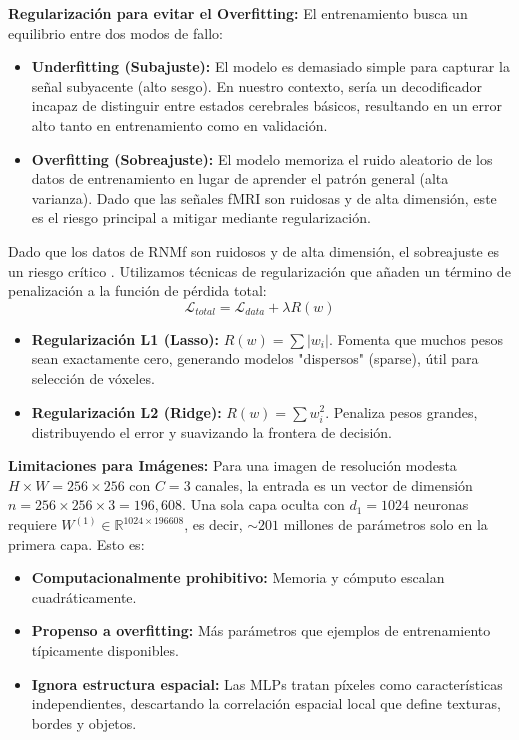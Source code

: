 \documentclass{article}
\begin{document}
\textbf{Regularización para evitar el Overfitting:}
El entrenamiento busca un equilibrio entre dos modos de fallo:
\begin{itemize}
    \item \textbf{Underfitting (Subajuste):} El modelo es demasiado simple para capturar la señal subyacente (alto sesgo). En nuestro contexto, sería un decodificador incapaz de distinguir entre estados cerebrales básicos, resultando en un error alto tanto en entrenamiento como en validación.
    \item \textbf{Overfitting (Sobreajuste):} El modelo memoriza el ruido aleatorio de los datos de entrenamiento en lugar de aprender el patrón general (alta varianza). Dado que las señales fMRI son ruidosas y de alta dimensión, este es el riesgo principal a mitigar mediante regularización.
\end{itemize}
Dado que los datos de RNMf son ruidosos y de alta dimensión, el sobreajuste es un riesgo crítico \cite{14}. Utilizamos técnicas de regularización que añaden un término de penalización a la función de pérdida total:
\begin{equation}
    \mathcal{L}_{total} = \mathcal{L}_{data} + \lambda R(w)
\end{equation}
\begin{itemize}
    \item \textbf{Regularización L1 (Lasso):} $R(w) = \sum |w_i|$. Fomenta que muchos pesos sean exactamente cero, generando modelos "dispersos" (sparse), útil para selección de vóxeles.
    \item \textbf{Regularización L2 (Ridge):} $R(w) = \sum w_i^2$. Penaliza pesos grandes, distribuyendo el error y suavizando la frontera de decisión.
\end{itemize}

\textbf{Limitaciones para Imágenes:} Para una imagen de resolución modesta $H \times W = 256 \times 256$ con $C=3$ canales, la entrada es un vector de dimensión $n = 256 \times 256 \times 3 = 196{,}608$. Una sola capa oculta con $d_1 = 1024$ neuronas requiere $W^{(1)} \in \mathbb{R}^{1024 \times 196608}$, es decir, $\sim 201$ millones de parámetros solo en la primera capa. Esto es:
\begin{itemize}
    \item \textbf{Computacionalmente prohibitivo:} Memoria y cómputo escalan cuadráticamente.
    \item \textbf{Propenso a overfitting:} Más parámetros que ejemplos de entrenamiento típicamente disponibles.
    \item \textbf{Ignora estructura espacial:} Las MLPs tratan píxeles como características independientes, descartando la correlación espacial local que define texturas, bordes y objetos.
\end{itemize}
\end{document}
